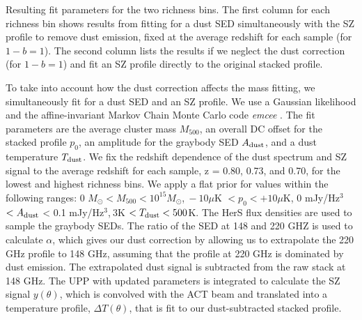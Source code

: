 \documentclass[a4paper,fleqn,usenatbib]{mnras}
\begin{document}
\begin{table}
\begin{threeparttable}
\begin{tabular}{|*{10}{c|}}
    \end{tabular}
  \begin{tablenotes}
	\item Resulting fit parameters for the two richness bins. The first column for each richness bin shows results from fitting for a dust SED simultaneously with the SZ profile to remove dust emission, fixed at the average redshift for each sample (for $1-b=1$). The second column lists the results if we neglect the dust correction (for $1-b=1$) and fit an SZ profile directly to the original stacked profile. %
  \end{tablenotes}
  \end{threeparttable}
\label{table:mcmcfitparam}
\end{table}


To take into account how the dust correction affects the mass fitting, we simultaneously fit for a dust SED and an SZ profile. We use a Gaussian likelihood and the affine-invariant Markov Chain Monte Carlo code \textit{emcee} \citep{2013PASP..125..306F}. The fit parameters are the average cluster mass $M_{500}$, an overall DC offset for the stacked profile $p_0$, an amplitude for the graybody SED $A_{\rm dust}$, and a dust temperature $T_{\rm dust}$. We fix the redshift dependence of the dust spectrum and SZ signal to the average redshift for each sample, z = 0.80, 0.73, and 0.70, for the lowest and highest richness bins. We apply a flat prior for values within the following ranges: 0 $M_{\odot} <  M_{500} < 10^{15} M_{\odot}$,$\ -10 \mu$K $< p_0 < +10 \mu$K, 0 mJy/Hz$^3$ $< A_{\rm dust}$ < 0.1 mJy/Hz$^3$,$\ 3 $K $< T_{\rm dust} < 500$K. 
The HerS flux densities are used to sample the graybody SEDs. The ratio of the SED at 148 and 220 GHZ is used to calculate $\alpha$, which gives our dust correction by allowing us to extrapolate the 220 GHz profile to 148 GHz, assuming that the profile at 220 GHz is dominated by dust emission. The extrapolated dust signal is subtracted from the raw stack at 148 GHz.
The UPP with updated parameters is integrated to calculate the SZ signal $y(\theta)$, which is convolved with the ACT beam and translated into a temperature profile, $\Delta T(\theta)$, that is fit to our dust-subtracted stacked profile. 
\end{document}
